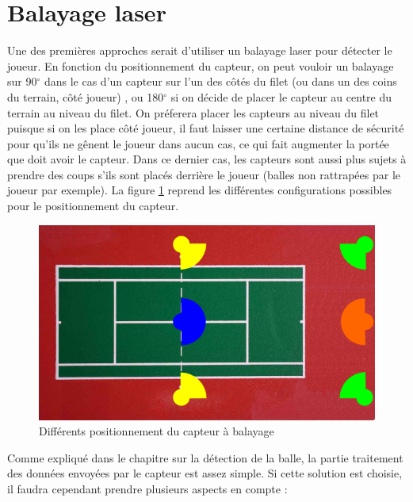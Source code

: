 \section{Balayage laser}

Une des premières approches serait d'utiliser un balayage laser pour détecter le joueur. En fonction du positionnement du capteur, on peut vouloir un balayage sur 90$^\circ$ dans le cas d'un capteur sur l'un des côtés du filet (ou dans un des coins du terrain, côté joueur) , ou 180$^\circ$ si on décide de placer le capteur au centre du terrain au niveau du filet. On préferera placer les capteurs au niveau du filet puisque si on les place côté joueur, il faut laisser une certaine distance de sécurité pour qu'ils ne gênent le joueur dans aucun cas, ce qui fait augmenter la portée que doit avoir le capteur. Dans ce dernier cas, les capteurs sont aussi plus sujets à prendre des coups s'ils sont placés derrière le joueur (balles non rattrapées par le joueur par exemple). La figure \ref{img_joueurpositionlaser} reprend les différentes configurations possibles pour le positionnement du capteur. 

\begin{figure}[h]
\begin{center}
\includegraphics[width=\textwidth]{joueurpositionlaser.png}
\caption{Différents positionnement du capteur à balayage}
\label{img_joueurpositionlaser}
\end{center}
\end{figure}

Comme expliqué dans le chapitre sur la détection de la balle, la partie traitement des données envoyées par le capteur est assez simple. Si cette solution est choisie, il faudra cependant prendre plusieurs aspects en compte : 

